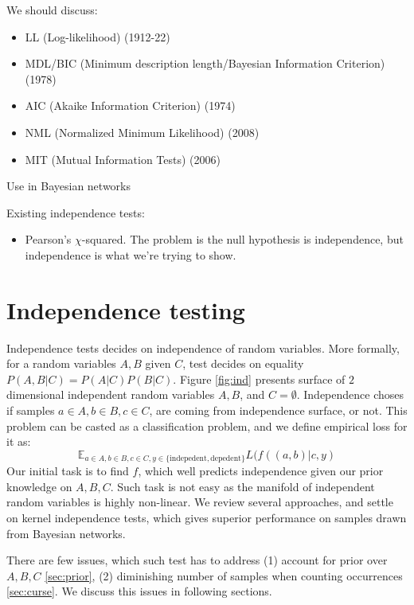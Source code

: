 \documentclass{article} %
\begin{document}
We should discuss:
\begin{itemize}
\item LL (Log-likelihood) (1912-22)
\item MDL/BIC (Minimum description length/Bayesian Information Criterion) (1978)
\item AIC (Akaike Information Criterion) (1974)
\item NML (Normalized Minimum Likelihood) (2008)
\item MIT (Mutual Information Tests) (2006)
\end{itemize}
Use in Bayesian networks \cite{schafer2005empirical}

Existing independence tests:
\begin{itemize}
\item Pearson's $\chi$-squared.  The problem is the null hypothesis is independence, but independence is what we're trying to show.
\end{itemize}

\cite{margaritis2003learning}

\section{Independence testing} 
Independence tests decides on independence of random variables. More formally,
for a random variables $A, B$ given $C$, test decides on equality $P(A, B| C) = P(A | C) P(B | C)$. 
Figure \ref{fig:ind} presents surface of $2$ dimensional independent 
random variables $A, B$, and $C = \emptyset$. Independence choses if samples $a \in A, b \in B, c \in C$, 
are coming from independence surface, or not. 
This problem can be casted as a classification problem, and we define
empirical loss for it as:
\begin{equation}
  \mathbb{E}_{a \in A, b \in B, c \in C, y \in \{\text{indepedent}, \text{depedent}\}} L(f((a, b)|c, y)
\end{equation}
Our initial task is to find $f$, which well predicts independence given our prior
knowledge on $A, B, C$. Such task is not easy as the manifold of independent
random variables is highly non-linear. We review several approaches, and 
settle on kernel independence tests, which gives superior performance on
samples drawn from Bayesian networks.


There are few issues, which such test has to address 
(1) account for prior over $A, B, C$ \ref{sec:prior}, (2) diminishing number of samples when
counting occurrences \ref{sec:curse}. We discuss this issues
in following sections.
\end{document}
